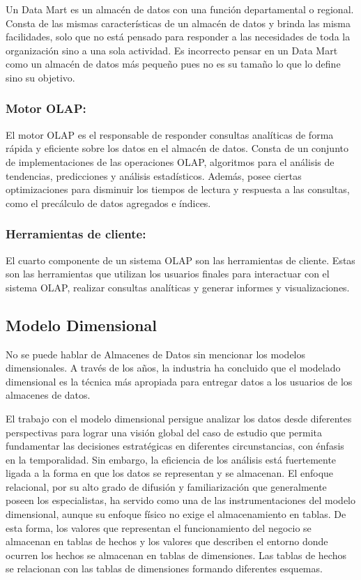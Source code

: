 Un Data Mart es un almac\'en de datos con una funci\'on departamental o regional. Consta de las mismas caracter\'isticas de un 
almacén de datos y brinda las misma facilidades, solo que no est\'a pensado para responder a las necesidades de toda la organización
sino a una sola actividad. Es incorrecto pensar en un Data Mart como un almac\'en de datos m\'as pequeño pues no es su tamaño 
lo que lo define sino su objetivo\cite{mijailmaster}.


\subsubsection{Motor OLAP:}
El motor OLAP es el responsable de responder consultas analíticas de forma rápida y eficiente sobre 
los datos en el almacén de datos. Consta de un conjunto de implementaciones de las operaciones OLAP, algoritmos 
para el análisis de tendencias, predicciones y análisis estadísticos. Además, posee ciertas optimizaciones para 
disminuir los tiempos de lectura y respuesta a las consultas, como el precálculo de datos agregados e índices.
 
\subsubsection{Herramientas de cliente:}
El cuarto componente de un sistema OLAP son las herramientas de cliente. Estas son las herramientas que utilizan los 
usuarios finales para interactuar con el sistema OLAP, realizar consultas analíticas y generar informes y visualizaciones.


\subsection{Modelo Dimensional}

No se puede hablar de Almacenes de Datos sin mencionar los modelos dimensionales. A través de los a\~{n}os, la industria 
ha concluido que el modelado dimensional es la técnica m\'as apropiada para entregar datos a los usuarios de los 
almacenes de datos.

El trabajo con el modelo dimensional persigue analizar los datos desde diferentes perspectivas para lograr una visión 
global del caso de estudio que permita fundamentar las decisiones estratégicas en diferentes circunstancias, con énfasis 
en la temporalidad. Sin embargo, la eficiencia de los análisis est\'a fuertemente ligada a la forma en que los datos 
se representan y se almacenan. El enfoque relacional, por su alto grado de difusión y familiarización que generalmente 
poseen los especialistas, ha servido como una de las instrumentaciones del modelo dimensional, aunque su enfoque f\'isico 
no exige el almacenamiento en tablas. De esta forma, los valores que representan el funcionamiento del negocio se almacenan 
en tablas de hechos y los valores que describen el entorno donde ocurren los hechos se almacenan en tablas de dimensiones.
Las tablas de hechos se relacionan con las tablas de dimensiones formando diferentes esquemas.

